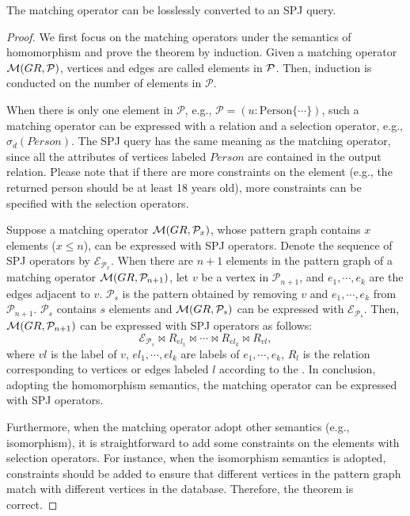 \begin{lemma}
    \label{lemma:spjm-to-spj}
    The matching operator can be losslessly converted to an SPJ query.
\end{lemma}
\begin{proof}
    We first focus on the matching operators under the semantics of homomorphism and prove the theorem by induction.
    Given a matching operator $\mathcal{M}(GR, \mathcal{P})$, vertices and edges are called elements in $\mathcal{P}$.
    Then, induction is conducted on the number of elements in $\mathcal{P}$.
    
    When there is only one element in $\mathcal{P}$, e.g., $\mathcal{P}=(u:\text{Person} \{\cdots\})$, such a matching operator can be expressed with a relation and a selection operator, e.g., $\sigma_d(Person)$.
    The SPJ query has the same meaning as the matching operator, since all the attributes of vertices labeled $Person$ are contained in the output relation.
    Please note that if there are more constraints on the element (e.g., the returned person should be at least 18 years old), more constraints can be specified with the selection operators.

    Suppose a matching operator $\mathcal{M}(GR, \mathcal{P}_x)$, whose pattern graph contains $x$ elements ($x \leq n$), can be expressed with SPJ operators.
    Denote the sequence of SPJ operators by $\mathcal{E}_{\mathcal{P}_x}$.
    When there are $n+1$ elements in the pattern graph of a matching operator $\mathcal{M}(GR, \mathcal{P}_{n+1})$, let $v$ be a vertex in $\mathcal{P}_{n+1}$, and $e_1, \cdots, e_k$ are the edges adjacent to $v$. %
    $\mathcal{P}_s$ is the pattern obtained by removing $v$ and $e_1, \cdots, e_k$ from $\mathcal{P}_{n+1}$.
    $\mathcal{P}_s$ contains $s$ elements and $\mathcal{M}(GR, \mathcal{P}_s)$ can be expressed with $\mathcal{E}_{\mathcal{P}_s}$.
    Then, $\mathcal{M}(GR, \mathcal{P}_{n+1})$ can be expressed with SPJ operators as follows:
    \begin{equation*}
        \mathcal{E}_{\mathcal{P}_s} \Join R_{el_1} \Join \cdots \Join R_{el_k} \Join R_{vl},
    \end{equation*}
    where $vl$ is the label of $v$, $el_1, \cdots, el_k$ are labels of $e_1, \cdots, e_k$, $R_{l}$ is the relation corresponding to vertices or edges labeled $l$ according to the \rgmapping.
    In conclusion, adopting the homomorphism semantics, the matching operator can be expressed with SPJ operators.

    Furthermore, when the matching operator adopt other semantics (e.g., isomorphism), it is straightforward to add some constraints on the elements with selection operators.
    For instance, when the isomorphism semantics is adopted, constraints should be added to ensure that different vertices in the pattern graph match with different vertices in the database.
    Therefore, the theorem is correct. 
\end{proof}

